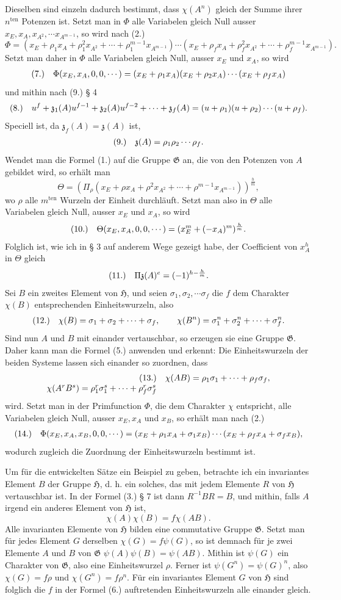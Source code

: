 \documentclass[11pt]{article}
\makeatletter
\newcommand{\Hgrp}{\mathfrak{H}}
\newcommand{\Ggrp}{\mathfrak{G}}
\newcommand{\zchar}{\mathfrak{z}}
\newcommand{\frobtagc}[2]{\[\begin{array}{@{}r@{\quad}c@{}}\textup{(#1)} & \displaystyle #2\end{array}\]}
\makeatother
\begin{document}
Dieselben sind einzeln dadurch bestimmt, dass $\chi(A^n)$ gleich der Summe ihrer $n^{\mathrm{ten}}$ Potenzen ist. Setzt man in $\Phi$ alle Variabelen gleich Null ausser $x_E,x_A,x_{A^2},\cdots x_{A^{m-1}}$, so wird nach (2.)
\[
\Phi=(x_E+\rho_1x_A+\rho_1^2x_{A^2}+\cdots+\rho_1^{m-1}x_{A^{m-1}})\cdots(x_E+\rho_fx_A+\rho_f^2x_{A^2}+\cdots+\rho_f^{m-1}x_{A^{m-1}}).
\]
Setzt man daher in $\Phi$ alle Variabelen gleich Null, ausser $x_E$ und $x_A$, so wird
\frobtagc{7.}{\Phi(x_E,x_A,0,0,\cdots)=(x_E+\rho_1x_A)(x_E+\rho_2x_A)\cdots(x_E+\rho_fx_A)}
und mithin nach (9.) § 4
\frobtagc{8.}{u^f+\zchar_1(A)u^{f-1}+\zchar_2(A)u^{f-2}+\cdots+\zchar_f(A)=(u+\rho_1)(u+\rho_2)\cdots(u+\rho_f).}
Speciell ist, da $\zchar_f(A)=\zchar(A)$ ist,
\frobtagc{9.}{\zchar(A)=\rho_1\rho_2\cdots\rho_f.}
Wendet man die Formel (1.) auf die Gruppe $\Ggrp$ an, die von den Potenzen von $A$ gebildet wird, so erhält man
\[
\Theta=\left(\Pi_\rho(x_E+\rho x_A+\rho^2x_{A^2}+\cdots+\rho^{m-1}x_{A^{m-1}})\right)^{\frac{h}{m}},
\]
wo $\rho$ alle $m^{\mathrm{ten}}$ Wurzeln der Einheit durchläuft. Setzt man also in $\Theta$ alle Variabelen gleich Null, ausser $x_E$ und $x_A$, so wird
\frobtagc{10.}{\Theta(x_E,x_A,0,0,\cdots)=(x_E^m+(-x_A)^m)^{\frac{h}{m}}.}
Folglich ist, wie ich in § 3 auf anderem Wege gezeigt habe, der Coefficient von $x_A^h$ in $\Theta$ gleich
\frobtagc{11.}{\Pi\zchar(A)^e=(-1)^{h-\frac{h}{m}}.}
Sei $B$ ein zweites Element von $\Hgrp$, und seien $\sigma_1,\sigma_2,\cdots\sigma_f$ die $f$ dem Charakter $\chi(B)$ entsprechenden Einheitswurzeln, also
\frobtagc{12.}{\chi(B)=\sigma_1+\sigma_2+\cdots+\sigma_f,\qquad \chi(B^n)=\sigma_1^n+\sigma_2^n+\cdots+\sigma_f^n.}
Sind nun $A$ und $B$ mit einander vertauschbar, so erzeugen sie eine Gruppe $\Ggrp$. Daher kann man die Formel (5.) anwenden und erkennt: Die Einheitswurzeln der beiden Systeme lassen sich einander so zuordnen, dass
\frobtagc{13.}{\chi(AB)=\rho_1\sigma_1+\cdots+\rho_f\sigma_f,\\ \chi(A^rB^s)=\rho_1^r\sigma_1^s+\cdots+\rho_f^r\sigma_f^s}
wird. Setzt man in der Primfunction $\Phi$, die dem Charakter $\chi$ entspricht, alle Variabelen gleich Null, ausser $x_E,x_A$ und $x_B$, so erhält man nach (2.)
\frobtagc{14.}{\Phi(x_E,x_A,x_B,0,0,\cdots)=(x_E+\rho_1x_A+\sigma_1x_B)\cdots(x_E+\rho_fx_A+\sigma_fx_B),}
wodurch zugleich die Zuordnung der Einheitswurzeln bestimmt ist.

Um für die entwickelten Sätze ein Beispiel zu geben, betrachte ich ein invariantes Element $B$ der Gruppe $\Hgrp$, d. h. ein solches, das mit jedem Elemente $R$ von $\Hgrp$ vertauschbar ist. In der Formel (3.) § 7 ist dann $R^{-1}BR=B$, und mithin, falls $A$ irgend ein anderes Element von $\Hgrp$ ist,
\[
\chi(A)\chi(B)=f\chi(AB).
\]
Alle invarianten Elemente von $\Hgrp$ bilden eine commutative Gruppe $\Ggrp$. Setzt man für jedes Element $G$ derselben $\chi(G)=f\psi(G)$, so ist demnach für je zwei Elemente $A$ und $B$ von $\Ggrp$ $\psi(A)\psi(B)=\psi(AB)$. Mithin ist $\psi(G)$ ein Charakter von $\Ggrp$, also eine Einheitswurzel $\rho$. Ferner ist $\psi(G^n)=\psi(G)^n$, also $\chi(G)=f\rho$ und $\chi(G^n)=f\rho^n$. Für ein invariantes Element $G$ von $\Hgrp$ sind folglich die $f$ in der Formel (6.) auftretenden Einheitswurzeln alle einander gleich.
\end{document}
